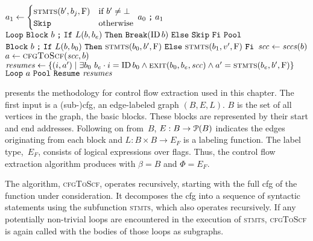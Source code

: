 \begin{algorithm}
\begin{algorithmic}
      \State $a_1\gets\begin{cases}
        \Call{stmts}{b',b_j,\false} & \text{if }b'\neq\bot \\
        \ASkip & \text{otherwise}
      \end{cases}$
      \State\Return $a_0\mathrel{\texttt{;}} a_1$
    \EndFunction
      \State\Return $\texttt{Loop}~\texttt{Block}~b\mathrel{\texttt{;}}
      \texttt{If}~L(b,b_e)~\texttt{Then}~\texttt{Break}(\operatorname{ID} b)~\texttt{Else}~\texttt{Skip}~\texttt{Fi}~\texttt{Pool}$
    \EndFunction
        \State\Return $\ABB~b\ASeq\AIf~L(b,b_0)~\AThen~
        \Call{stmts}{b_0,b',\false}~\AElse~\Call{stmts}{b_1,v',\false}~\AFi$
    \EndFunction
    \label{line:loop}
      \State $\mathit{scc}\gets\mathit{sccs}(b)$
      \State $a\gets\Call{cfgToScf}{\var{scc},b}$
      \State $\var{resumes}\gets\{(i,a')\mid
      \exists b_0~b_e\cdot i=\ID b_0\wedge
      \Call{exit}{b_0,b_e,\var{scc}}\wedge a'=\Call{stmts}{b_e,b',\false}\}$
      \State\Return $\texttt{Loop}~a~\texttt{Pool}~\texttt{Resume}~\mathit{resumes}$
    \EndFunction
  \end{algorithmic}
\end{algorithm}

 presents the methodology for control flow extraction
used in this chapter.
The first input is a (sub-)\ac{cfg}, an edge-labeled graph $(B,E,L)$.
$B$ is the set of all vertices in the graph, the basic blocks.%
%
These blocks are represented by their start and end addresses.
Following on from~$B$, $E:B\rightarrow\operatorname{\mathcal{P}}(B)$%
indicates the edges originating from each block
and $L:B\times B\rightarrow E_F$ is a labeling function.
The label type,~$E_F$, consists of logical expressions over flags.%
Thus, the control flow extraction algorithm
produces  with $\beta=B$ and $\Phi=E_F$.

The algorithm, \textsc{cfgToScf}, operates recursively,
starting with the full \ac{cfg} of the function under consideration.
It decomposes the \ac{cfg} into a sequence of syntactic statements
using the subfunction \textsc{stmts}, which also operates recursively.
If any potentially non-trivial loops are encountered
in the execution of \textsc{stmts},
\textsc{cfgToScf} is again called with the bodies of those loops as subgraphs.

